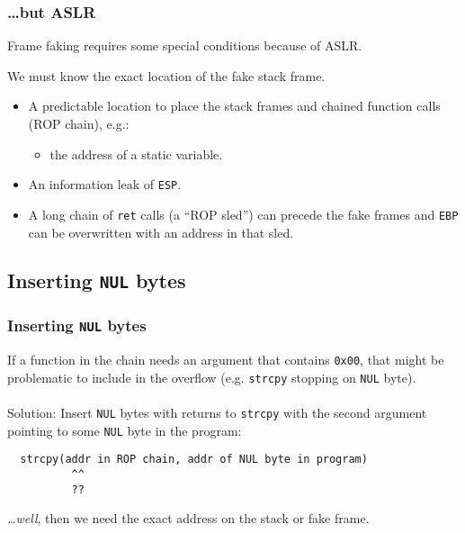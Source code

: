 \documentclass[10pt]{beamer}
\begin{document}
\begin{frame}
  \frametitle{\dots but ASLR}

  Frame faking requires some special conditions because of ASLR.

  We must know the exact location of the fake stack frame.

  \begin{itemize}
    \item A predictable location to place the stack frames and chained function
      calls (ROP chain), e.g.:
      \begin{itemize}
        \item the address of a static variable.
      \end{itemize}

    \item An information leak of \texttt{ESP}.

    \item A long chain of \texttt{ret} calls (a ``ROP sled'') can precede the
      fake frames and \texttt{EBP} can be overwritten with an address in that
      sled.
  \end{itemize}
\end{frame}


\subsection{Inserting \texttt{NUL} bytes}

\begin{frame}[fragile]
  \frametitle{Inserting \texttt{NUL} bytes}

  If a function in the chain needs an argument that contains \texttt{0x00},
  that might be problematic to include in the overflow (e.g. \texttt{strcpy}
  stopping on \texttt{NUL} byte).
  \hfill\\
  \hfill\\

  Solution: Insert \texttt{NUL} bytes with returns to \texttt{strcpy} with the
  second argument pointing to some \texttt{NUL} byte in the program:

  \begin{verbatim}
  strcpy(addr in ROP chain, addr of NUL byte in program)
          ^^
          ??
  \end{verbatim}

  \emph{\dots well}, then we need the exact address on the stack or fake frame.
\end{frame}
\end{document}
